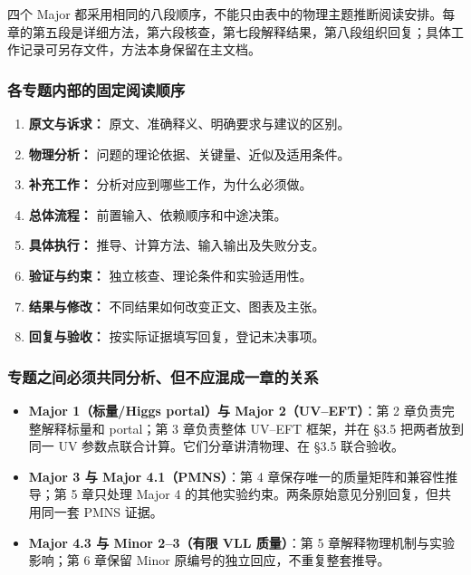 \documentclass[
  chinese,
  UTF8]{ctexart}
\providecommand{\tightlist}{%
  \setlength{\itemsep}{0pt}\setlength{\parskip}{0pt}}
\begin{document}
四个 Major
都采用相同的八段顺序，不能只由表中的物理主题推断阅读安排。每章的第五段是详细方法，第六段核查，第七段解释结果，第八段组织回复；具体工作记录可另存文件，方法本身保留在主文档。

\subsubsection{各专题内部的固定阅读顺序}\label{ux5404ux4e13ux9898ux5185ux90e8ux7684ux56faux5b9aux9605ux8bfbux987aux5e8f}

\begin{enumerate}
\def\labelenumi{\arabic{enumi}.}
\tightlist
\item
  \textbf{原文与诉求：} 原文、准确释义、明确要求与建议的区别。
\item
  \textbf{物理分析：} 问题的理论依据、关键量、近似及适用条件。
\item
  \textbf{补充工作：} 分析对应到哪些工作，为什么必须做。
\item
  \textbf{总体流程：} 前置输入、依赖顺序和中途决策。
\item
  \textbf{具体执行：} 推导、计算方法、输入输出及失败分支。
\item
  \textbf{验证与约束：} 独立核查、理论条件和实验适用性。
\item
  \textbf{结果与修改：} 不同结果如何改变正文、图表及主张。
\item
  \textbf{回复与验收：} 按实际证据填写回复，登记未决事项。
\end{enumerate}

\subsubsection{专题之间必须共同分析、但不应混成一章的关系}\label{ux4e13ux9898ux4e4bux95f4ux5fc5ux987bux5171ux540cux5206ux6790ux4f46ux4e0dux5e94ux6df7ux6210ux4e00ux7ae0ux7684ux5173ux7cfb}

\begin{itemize}
\tightlist
\item
  \textbf{Major 1（标量/Higgs portal）与 Major 2（UV--EFT）}：第 2
  章负责完整解释标量和 portal；第 3 章负责整体 UV--EFT 框架，并在 §3.5
  把两者放到同一 UV 参数点联合计算。它们分章讲清物理、在 §3.5 联合验收。
\item
  \textbf{Major 3 与 Major 4.1（PMNS）}：第 4
  章保存唯一的质量矩阵和兼容性推导；第 5 章只处理 Major 4
  的其他实验约束。两条原始意见分别回复，但共用同一套 PMNS 证据。
\item
  \textbf{Major 4.3 与 Minor 2--3（有限 VLL 质量）}：第 5
  章解释物理机制与实验影响；第 6 章保留 Minor
  原编号的独立回应，不重复整套推导。
\end{itemize}
\end{document}
